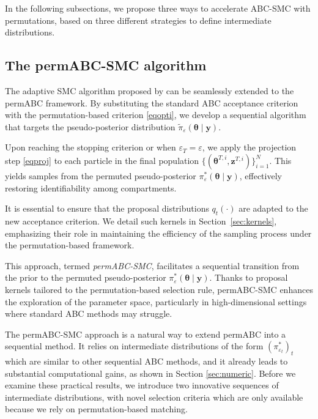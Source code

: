 \documentclass[11pt,a4paper]{article}
\def\obsdata{\mathbf{y}}
\def\param{\boldsymbol{\theta}}
\def\simdata{\mathbf{z}}
\theoremstyle{plain}
\theoremstyle{definition}
\theoremstyle{remark}
\begin{document}
In the following subsections, we propose three ways to accelerate ABC-SMC with permutations, based on three different strategies to define intermediate distributions.

\subsection{The permABC-SMC algorithm}

The adaptive SMC algorithm proposed by \citet{delmoralAdaptiveSequentialMonte2012} can be seamlessly extended to the permABC framework. By substituting the standard ABC acceptance criterion with the permutation-based criterion \eqref{eqopti}, we develop a sequential algorithm that targets the pseudo-posterior distribution \( \tilde{\pi}_\varepsilon(\param \mid \obsdata) \).

Upon reaching the stopping criterion or when \( \varepsilon_T = \varepsilon \), we apply the projection step \eqref{eqproj} to each particle in the final population \( \{(\param^{T,i}, \simdata^{T,i})\}_{i=1}^N \). This yields samples from the permuted pseudo-posterior \( \pi_\varepsilon^*(\param \mid \obsdata) \), effectively restoring identifiability among compartments.

It is essential to ensure that the proposal distributions \( q_t(\cdot) \) are adapted to the new acceptance criterion. We detail such kernels in Section~\ref{sec:kernels}, emphasizing their role in maintaining the efficiency of the sampling process under the permutation-based framework.

This approach, termed \emph{permABC-SMC}, facilitates a sequential transition from the prior to the permuted pseudo-posterior \( \pi^*_\varepsilon(\param \mid \obsdata) \). Thanks to proposal kernels tailored to the permutation-based selection rule, permABC-SMC enhances the exploration of the parameter space, particularly in high-dimensional settings where standard ABC methods may struggle.

The permABC-SMC approach is a natural way to extend permABC into a sequential method. It relies on intermediate distributions of the form $(\pi^*_{\varepsilon_t})_t$ which are similar to other sequential ABC methods, and it already leads to substantial computational gains, as shown in Section \ref{sec:numeric}. Before we examine these practical results, we introduce two innovative sequences of intermediate distributions, with novel selection criteria which are only available because we rely on permutation-based matching.
\end{document}
